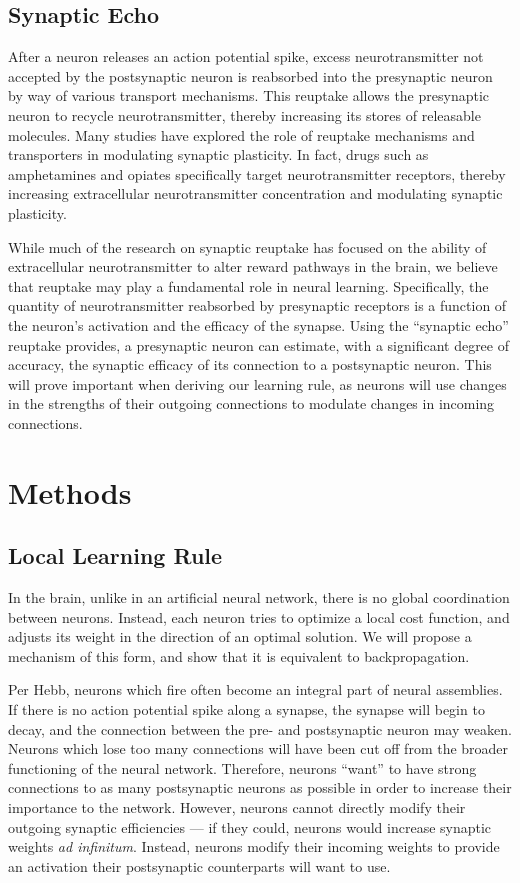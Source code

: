 \documentclass[12pt]{article}
\begin{document}
\subsection{Synaptic Echo}
After a neuron releases an action potential spike, excess neurotransmitter not accepted by the postsynaptic neuron is reabsorbed into the presynaptic neuron by way of various transport mechanisms. \cite{Rudnick1993} This reuptake allows the presynaptic neuron to recycle neurotransmitter, thereby increasing its stores of releasable molecules. \cite{Rudnick1993} Many studies have explored the role of reuptake mechanisms and transporters in modulating synaptic plasticity. \cite{Duman2016} In fact, drugs such as amphetamines and opiates specifically target neurotransmitter receptors, thereby increasing extracellular neurotransmitter concentration and modulating synaptic plasticity. \cite{Amara1998}

While much of the research on synaptic reuptake has focused on the ability of extracellular neurotransmitter to alter reward pathways in the brain, \cite{Koob1992} we believe that reuptake may play a fundamental role in neural learning. Specifically, the quantity of neurotransmitter reabsorbed by presynaptic receptors is a function of the neuron's activation and the efficacy of the synapse. Using the ``synaptic echo'' reuptake provides, a presynaptic neuron can estimate, with a significant degree of accuracy, the synaptic efficacy of its connection to a postsynaptic neuron. This will prove important when deriving our learning rule, as neurons will use changes in the strengths of their outgoing connections to modulate changes in incoming connections.

\section{Methods}
\subsection{Local Learning Rule}
In the brain, unlike in an artificial neural network, there is no global coordination between neurons. Instead, each neuron tries to optimize a local cost function, and adjusts its weight in the direction of an optimal solution. We will propose a mechanism of this form, and show that it is equivalent to backpropagation.

Per Hebb, neurons which fire often become an integral part of neural assemblies. \cite{Hebb1949} If there is no action potential spike along a synapse, the synapse will begin to decay, and the connection between the pre- and postsynaptic neuron may weaken. Neurons which lose too many connections will have been cut off from the broader functioning of the neural network. Therefore, neurons ``want'' to have strong connections to as many postsynaptic neurons as possible in order to increase their importance to the network. However, neurons cannot directly modify their outgoing synaptic efficiencies --- if they could, neurons would increase synaptic weights \emph{ad infinitum}. Instead, neurons modify their incoming weights to provide an activation their postsynaptic counterparts will want to use.
\end{document}
